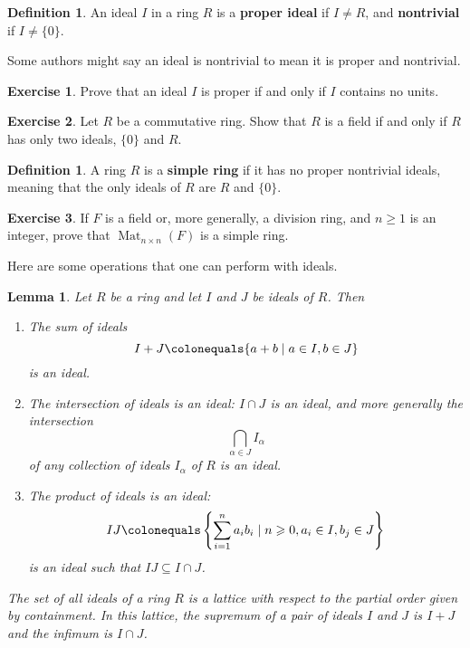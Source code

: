 \documentclass[12pt]{report}
\newtheorem{lemma}[theorem]{Lemma}
\numberwithin{equation}{section}
\numberwithin{theorem}{chapter}
\theoremstyle{definition}
\newtheorem{definition}[theorem]{Definition}
\newtheorem{exercise}{Exercise}
\newtheorem*{basic properties}{Basic Properties}
\newtheorem*{Important Remark}{Important Remark}
\newcommand{\df}[1]{{\bf #1}\index{#1}}
\DeclareMathOperator{\Mat}{Mat}
\begin{document}
\begin{definition}
	An ideal $I$ in a ring $R$ is a {\bf proper ideal} if $I\neq R$, and {\bf nontrivial} if $I \neq \{ 0 \}$. 
\end{definition}


Some authors might say an ideal is nontrivial to mean it is proper and nontrivial.


\begin{exercise}
Prove that an ideal $I$ is proper if and only if $I$ contains no units.
\end{exercise}


\begin{exercise}\label{field iff only 2 ideals}
	Let $R$ be a commutative ring. Show that $R$ is a field if and only if $R$ has only two ideals, $\{0\}$ and $R$.
\end{exercise}

\begin{definition}
	A ring $R$ is a \df{simple ring} if it has no proper nontrivial ideals, meaning that the only ideals of $R$ are $R$ and $\{ 0 \}$.
\end{definition}

\begin{exercise} 
If $F$ is a field  or, more generally, a division ring, and $n \geqslant 1$ is an integer, prove that $\Mat_{n \times n}(F)$ is a simple ring.
\end{exercise}


Here are some operations that one can perform with ideals. 

\begin{lemma}\label{ideal lattice} 
Let $R$ be a ring and let $I$ and $J$ be ideals of $R$.
Then
\begin{enumerate}[itemsep=0.1em]
\item The sum of ideals 
$$I + J \colonequals \{a + b \mid a \in I, b \in J\}$$
is an ideal.
\item The intersection of ideals is an ideal: $I\cap J$ is an ideal, and more generally the intersection 
$$\bigcap_{\alpha \in J} I_\alpha$$ 
of any collection of ideals $I_\alpha$ of $R$ is an ideal.
\item The product of ideals is an ideal:
$$IJ \colonequals \left\lbrace \sum_{i=1}^n a_ib_i \mid n \geqslant 0, a_i \in I, b_j\in J \right\rbrace$$ 
is an ideal such that $IJ \subseteq I\cap J$. 
\end{enumerate}
The set of all ideals of a ring $R$ is a lattice with respect to the partial order given by containment. In this lattice, the supremum of a pair of ideals $I$ and $J$ is $I+J$ and the infimum is $I\cap J$.
\end{lemma}
\end{document}
